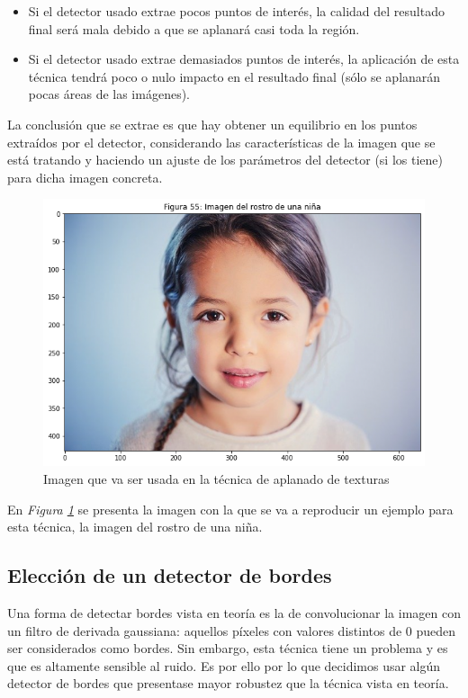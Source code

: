 \documentclass[11pt,twoside,titlepage,a4paper]{article}
\numberwithin{equation}{section} %
\theoremstyle{usual}
\begin{document}
\begin{itemize}
    \item Si el detector usado extrae pocos puntos de interés, la calidad del resultado final será mala debido a que se aplanará casi toda la región.
    \item Si el detector usado extrae demasiados puntos de interés, la aplicación de esta técnica tendrá poco o nulo impacto en el resultado final (sólo se aplanarán pocas áreas de las imágenes).
\end{itemize}

La conclusión que se extrae es que hay obtener un equilibrio en los puntos extraídos por el detector, considerando las características de la imagen que se está tratando y haciendo un ajuste de los parámetros del detector (si los tiene) para dicha imagen concreta.

\begin{figure}[h]
    \centering
    \includegraphics[width=.5\textwidth]{imagenes/PoissonImageEditing_cell_66_output_0.png}
    \caption{Imagen que va ser usada en la técnica de aplanado de texturas}
    \label{fig:imagenAplanadoTexturas}
\end{figure}

En \textit{Figura \ref{fig:imagenAplanadoTexturas}} se presenta la imagen con la que se va a reproducir un ejemplo para esta técnica, la imagen del rostro de una niña.

\subsection{Elección de un detector de bordes}

Una forma de detectar bordes vista en teoría es la de convolucionar la imagen con un filtro de derivada gaussiana: aquellos píxeles con valores distintos de 0 pueden ser considerados como bordes. Sin embargo, esta técnica tiene un problema y es que es altamente sensible al ruido. Es por ello por lo que decidimos usar algún detector de bordes que presentase mayor robustez que la técnica vista en teoría.
\end{document}
